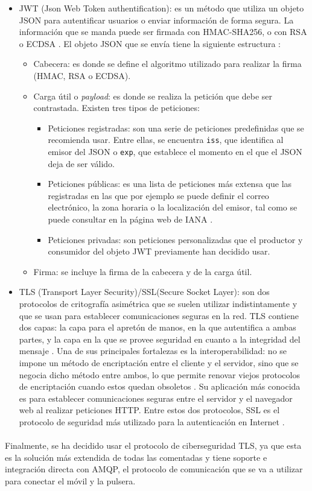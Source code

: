 \begin{itemize}
\item JWT (Json Web Token authentification): es un método que utiliza un objeto JSON para autentificar usuarios o enviar información de forma segura. La información que se manda puede ser firmada con HMAC-SHA256, o con RSA o ECDSA \citep{jwt}. El objeto JSON que se envía tiene la siguiente estructura \citep{rfc7519}:
\begin{itemize}
    \item Cabecera: es donde se define el algoritmo utilizado para realizar la firma (HMAC, RSA o ECDSA).
    \item Carga útil o \textit{payload}: es donde se realiza la petición que debe ser contrastada. Existen tres tipos de peticiones:
    \begin{itemize}
        \item Peticiones registradas: son una serie de peticiones predefinidas que se recomienda usar. Entre ellas, se encuentra \texttt{iss}, que identifica al emisor del JSON o \texttt{exp}, que establece el momento en el que el JSON deja de ser válido.
        \item Peticiones públicas: es una lista de peticiones más extensa que las registradas en las que por ejemplo se puede definir el correo electrónico, la zona horaria o la localización del emisor, tal como se puede consultar en la página web de IANA \citeyear{iana}.
        \item Peticiones privadas: son peticiones personalizadas que el productor y consumidor del objeto JWT previamente han decidido usar.
    \end{itemize}
    \item Firma: se incluye la firma de la cabecera y de la carga útil.
\end{itemize}

\item TLS (Transport Layer Security)/SSL(Secure Socket Layer): son dos protocolos de critografía asimétrica que se suelen utilizar indistintamente y que se usan para establecer comunicaciones seguras en la red. TLS contiene dos capas: la capa para el apretón de manos, en la que autentifica a ambas partes, y la capa en la que se provee seguridad en cuanto a la integridad del mensaje \citep{evaldsson2015evaluate}. Una de sus principales fortalezas es la interoperabilidad: no se impone un método de encriptación entre el cliente y el servidor, sino que se negocia dicho método entre ambos, lo que permite renovar viejos protocolos de encriptación cuando estos quedan obsoletos \citep{carlsson2018comparison}. Su aplicación más conocida es para establecer comunicaciones seguras entre el servidor y el navegador web al realizar peticiones HTTP. Entre estos dos protocolos, SSL es el protocolo de seguridad más utilizado para la autenticación en Internet \citep{viega2002network}.
\end{itemize}

\paragraph{}
Finalmente, se ha decidido usar el protocolo de ciberseguridad TLS, ya que esta es la solución más extendida de todas las comentadas y tiene soporte e integración directa con AMQP, el protocolo de comunicación que se va a utilizar para conectar el móvil y la pulsera.